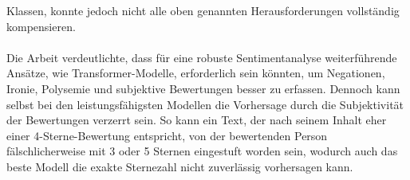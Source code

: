 Klassen, konnte jedoch nicht alle oben genannten Herausforderungen vollständig 
kompensieren.\\
\\
\noindent Die Arbeit verdeutlichte, dass für eine robuste Sentimentanalyse weiterführende 
Ansätze, wie Transformer-Modelle, erforderlich 
sein könnten, um Negationen, Ironie, Polysemie und subjektive Bewertungen besser 
zu erfassen. Dennoch kann selbst bei den leistungsfähigsten Modellen die 
Vorhersage durch die Subjektivität der Bewertungen verzerrt sein. So kann 
ein Text, der nach seinem Inhalt eher einer 4-Sterne-Bewertung 
entspricht, von der bewertenden Person fälschlicherweise mit 3 oder 5 Sternen 
eingestuft worden sein, wodurch auch das beste Modell die exakte Sternezahl 
nicht zuverlässig vorhersagen kann.